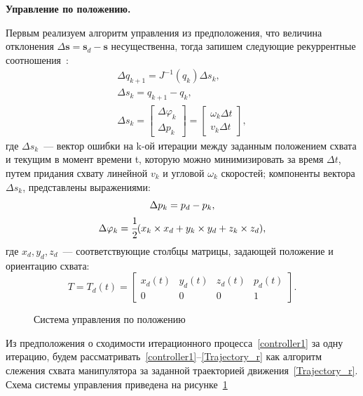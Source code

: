 \textbf{Управление по положению.}

Первым реализуем алгоритм управления из предположения, что величина отклонения $ \Delta \bm{s} = \bm{s}_d - \bm{s} $ несущественна, тогда запишем следующие рекуррентные соотношения~\cite{zenk2000}:
\begin{gather}
	\label{controller1}
	\Delta q_{k+1} = J^{-1}(q_k) \Delta s_k, \\
	\Delta s_k = q_{k+1} - q_k, \\
	\Delta s_k = 
	\begin{bmatrix}
		\Delta \varphi_k\\
		\Delta p_k
	\end{bmatrix}
	=
	\begin{bmatrix}
		\omega_k \Delta t \\
		v_k \Delta t
	\end{bmatrix}\!\!\!,
\end{gather}
где $ \Delta s_k $~--- вектор ошибки на k-ой итерации между заданным положением схвата и текущим в момент времени t, которую можно минимизировать за время $\Delta t$, путем придания схвату линейной $ v_k $ и угловой $ \omega_k $ скоростей; компоненты вектора $ \Delta s_k $, представлены выражениями:
\begin{gather}
	\Delta p_k = p_d - p_k, \\
	\Delta \varphi_k = \cfrac{1}{2} (x_k \times x_d + y_k \times y_d + z_k \times z_d),
\end{gather}
где $ x_d, y_d, z_d $~--- соответствующие столбцы матрицы, задающей положение и ориентацию схвата:
\begin{equation}\label{Trajectory_r}
	T = T_d(t) = 
	\begin{bmatrix}
		x_d(t) & y_d(t) & z_d(t) & p_d(t)\\
		0&0 &0 &1
	\end{bmatrix}.
\end{equation}

\begin{figure}[h!]
	\vspace{0.1cm}
	\caption{Система управления по положению}
	\label{img:controll_system_position}
\end{figure}

Из предположения о сходимости итерационного процесса~\eqref{controller1} за одну итерацию, будем рассматривать~\eqref{controller1}--\eqref{Trajectory_r} как алгоритм слежения схвата манипулятора за заданной траекторией движения~\eqref{Trajectory_r}. Схема системы управления приведена на рисунке~\ref{img:controll_system_position}
